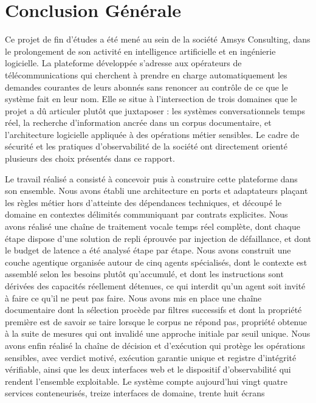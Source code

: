 \chapter*{Conclusion Générale}

Ce projet de fin d'études a été mené au sein de la société Amsys Consulting, dans le prolongement de son activité en intelligence artificielle et en ingénierie logicielle. La plateforme développée s'adresse aux opérateurs de télécommunications qui cherchent à prendre en charge automatiquement les demandes courantes de leurs abonnés sans renoncer au contrôle de ce que le système fait en leur nom. Elle se situe à l'intersection de trois domaines que le projet a dû articuler plutôt que juxtaposer : les systèmes conversationnels temps réel, la recherche d'information ancrée dans un corpus documentaire, et l'architecture logicielle appliquée à des opérations métier sensibles. Le cadre de sécurité et les pratiques d'observabilité de la société ont directement orienté plusieurs des choix présentés dans ce rapport.

Le travail réalisé a consisté à concevoir puis à construire cette plateforme dans son ensemble. Nous avons établi une architecture en ports et adaptateurs plaçant les règles métier hors d'atteinte des dépendances techniques, et découpé le domaine en contextes délimités communiquant par contrats explicites. Nous avons réalisé une chaîne de traitement vocale temps réel complète, dont chaque étape dispose d'une solution de repli éprouvée par injection de défaillance, et dont le budget de latence a été analysé étape par étape. Nous avons construit une couche agentique organisée autour de cinq agents spécialisés, dont le contexte est assemblé selon les besoins plutôt qu'accumulé, et dont les instructions sont dérivées des capacités réellement détenues, ce qui interdit qu'un agent soit invité à faire ce qu'il ne peut pas faire. Nous avons mis en place une chaîne documentaire dont la sélection procède par filtres successifs et dont la propriété première est de savoir se taire lorsque le corpus ne répond pas, propriété obtenue à la suite de mesures qui ont invalidé une approche initiale par seuil unique. Nous avons enfin réalisé la chaîne de décision et d'exécution qui protège les opérations sensibles, avec verdict motivé, exécution garantie unique et registre d'intégrité vérifiable, ainsi que les deux interfaces web et le dispositif d'observabilité qui rendent l'ensemble exploitable. Le système compte aujourd'hui vingt quatre services conteneurisés, treize interfaces de domaine, trente huit écrans

